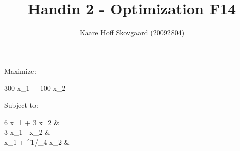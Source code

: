 \documentclass{report}
\author{Kaare Hoff Skovgaard (20092804)}
\title{Handin 2 - Optimization F14}
\newenvironment{eq*}[0]{
	\begin{equation*}
	\begin{aligned}
}{
	\end{aligned}
	\end{equation*}
}
\newcommand*\rfrac[2]{{}^{#1}\!/_{#2}}
\begin{document}
	\maketitle

	Maximize:
	\begin{eq*}
		300 x_1 + 100 x_2
	\end{eq*}
	Subject to:
	\begin{eq*}
		6 x_1 + 3 x_2 & \\
		3 x_1 - x_2 & \\
		x_1 + \rfrac{1}{4} x_2 &
	\end{eq*}

\end{document}
